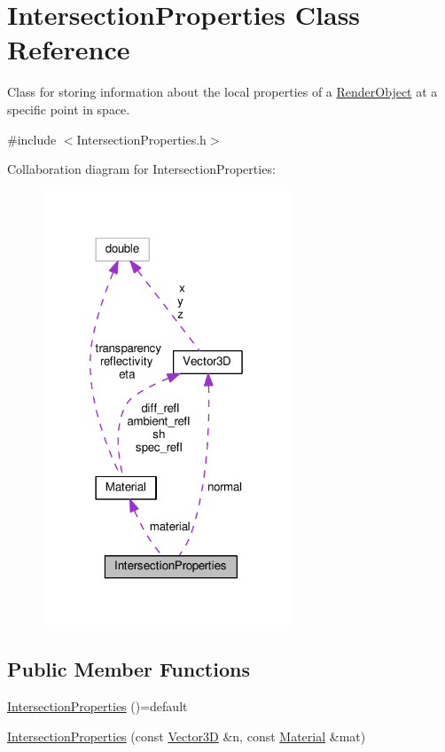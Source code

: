 \hypertarget{classIntersectionProperties}{}\section{Intersection\+Properties Class Reference}
\label{classIntersectionProperties}


Class for storing information about the local properties of a \hyperlink{classRenderObject}{Render\+Object} at a specific point in space.  




{\ttfamily \#include $<$Intersection\+Properties.\+h$>$}



Collaboration diagram for Intersection\+Properties\+:\nopagebreak
\begin{figure}[H]
\begin{center}
\leavevmode
\includegraphics[width=210pt]{classIntersectionProperties__coll__graph}
\end{center}
\end{figure}
\subsection*{Public Member Functions}
\begin{DoxyCompactItemize}
\item 
\hyperlink{classIntersectionProperties_af6f71f18a350a95cfab225d5f13be280}{Intersection\+Properties} ()=default
\item 
\hyperlink{classIntersectionProperties_a375cfefda4657bdc278504213347bde8}{Intersection\+Properties} (const \hyperlink{classVector3D}{Vector3D} \&n, const \hyperlink{classMaterial}{Material} \&mat)
\end{DoxyCompactItemize}
